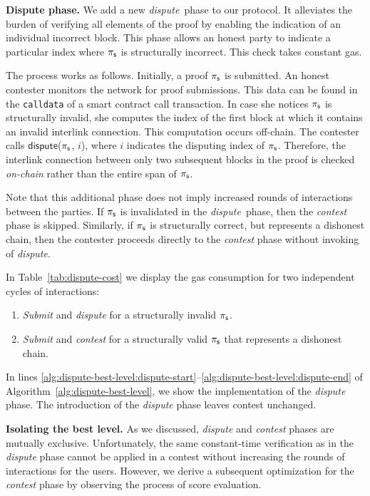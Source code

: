 

\newcommand{\dispute}{\emph{dispute\ }} \noindent \textbf{Dispute phase.} We
add a new \dispute phase to our protocol. It alleviates the burden of
verifying all elements of the proof by enabling the indication of an individual
incorrect block. This phase allows an honest party to indicate a particular index
where $\mathsf{\pi_{s}}$ is structurally incorrect. This check takes constant gas.

The process works as follows. Initially, a proof $\mathsf{\pi_{s}}$ is submitted.
An honest contester monitors the network for proof submissions. This data can be found
in the \texttt{calldata} of a smart contract call transaction. In case
she notices $\mathsf{\pi_{s}}$ is structurally invalid, she computes the index of the
first block at which it contains an invalid interlink connection. This computation
occurs off-chain.
The contester calls
$\textsf{dispute}$($\mathsf{\pi_{s}}$, $i$), where $i$
indicates the disputing index of $\mathsf{\pi_{s}}$. Therefore, the interlink connection between
only two subsequent blocks in the proof is
checked \emph{on-chain} rather than the entire span of $\mathsf{\pi_{s}}$.

Note that this additional phase does not imply increased rounds of
interactions between the parties. If $\mathsf{\pi_{s}}$ is invalidated in the
\dispute phase, then the \emph{contest} phase is skipped. Similarly, if
$\mathsf{\pi_{s}}$ is structurally correct, but represents a dishonest chain, then the contester
proceeds directly to the \emph{contest} phase without invoking of \emph{dispute}.



In Table~\ref{tab:dispute-cost} we display the gas consumption for
two independent cycles of interactions:
\begin{enumerate}
    \item \emph{Submit} and \emph{dispute} for a structurally invalid
        $\mathsf{\pi_{s}}$.
    \item \emph{Submit} and \emph{contest} for a structurally valid
        $\mathsf{\pi_{s}}$ that represents a dishonest chain.
\end{enumerate}

In lines \ref{alg:dispute-best-level:dispute-start}--\ref{alg:dispute-best-level:dispute-end}
of Algorithm~\ref{alg:dispute-best-level}, we show the implementation
of the \emph{dispute} phase. The introduction of the \emph{dispute} phase leaves
\textsf{contest} unchanged.

\noindent \textbf{Isolating the best level.} As we discussed, \emph{dispute}
and \emph{contest} phases are mutually exclusive. Unfortunately, the same
constant-time verification as in the \emph{dispute} phase cannot be applied in a
contest without increasing the rounds of interactions for the users. However,
we derive a subsequent optimization for the \emph{contest} phase by observing the
process of score evaluation.

